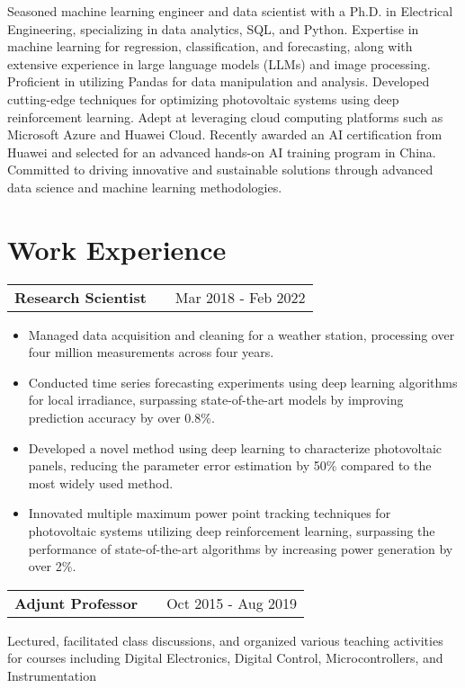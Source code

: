 \documentclass[a4paper,10pt]{article}
\makeatletter
\newenvironment{jobshort}[2]
    {
    \begin{tabularx}{\linewidth}{@{}l X r@{}}
    \textbf{#1} & \hfill &  #2 \\[3.75pt]
    \end{tabularx}
    }
    {
    }
\newenvironment{joblong}[2]
    {
    \begin{tabularx}{\linewidth}{@{}l X r@{}}
    \textbf{#1} & \hfill &  #2 \\[3.75pt]
    \end{tabularx}
    \begin{minipage}[t]{\linewidth}
    \begin{itemize}[nosep,after=\strut, leftmargin=1em, itemsep=3pt,label=--]
    }
    {
    \end{itemize}
    \end{minipage}    
    }
\makeatother
\begin{document}
Seasoned machine learning engineer and data scientist with a Ph.D. in Electrical Engineering, specializing in data analytics, SQL, and Python. Expertise in machine learning for regression, classification, and forecasting, along with extensive experience in large language models (LLMs) and image processing. Proficient in utilizing Pandas for data manipulation and analysis. Developed cutting-edge techniques for optimizing photovoltaic systems using deep reinforcement learning. Adept at leveraging cloud computing platforms such as Microsoft Azure and Huawei Cloud. Recently awarded an AI certification from Huawei and selected for an advanced hands-on AI training program in China. Committed to driving innovative and sustainable solutions through advanced data science and machine learning methodologies.

\section{Work Experience}

\begin{joblong}{Research Scientist}{Mar 2018 - Feb 2022}
\item Managed data acquisition and cleaning for a weather station, processing over four million measurements across four years.
\item Conducted time series forecasting experiments using deep learning algorithms for local irradiance, surpassing state-of-the-art models by improving prediction accuracy by over 0.8\%.
\item Developed a novel method using deep learning to characterize photovoltaic panels, reducing the parameter error estimation by 50\% compared to the most widely used method.
\item Innovated multiple maximum power point tracking techniques for photovoltaic systems utilizing deep reinforcement learning, surpassing the performance of state-of-the-art algorithms by increasing power generation by over 2\%.
\end{joblong}

\begin{jobshort}{Adjunt Professor}{Oct 2015 - Aug 2019}
Lectured, facilitated class discussions, and organized various teaching activities for courses including Digital Electronics, Digital Control, Microcontrollers, and Instrumentation
\end{jobshort}


\end{document}
